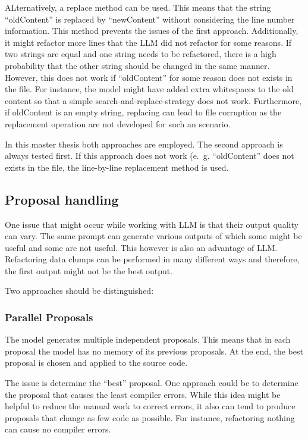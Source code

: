 ALternatively, a replace method can be used. This means that the string \enquote{oldContent} is replaced by \enquote{newContent} without considering the line number information. This method prevents the issues of the first approach. Additionally, it might refactor more lines that the \ac{LLM} did not refactor for some reasons. If two strings are equal and one string needs to be refactored, there is a high probability that the other string should be changed in the same manner. However, this does not work if \enquote{oldContent} for some reason does not exists in the file. For instance, the model might have added extra whitespaces to the old content so that a simple search-and-replace-strategy does not work. Furthermore, if oldContent is an empty string, replacing can lead to file corruption as the replacement operation are not developed for such an scenario. 

In this master thesis both approaches are employed. The second approach is always tested first. If this approach does not work (e.~g. \enquote{oldContent} does not exists in the file, the line-by-line replacement method is used.  





\subsection{Proposal handling}

One issue that might occur while working with \ac{LLM} is that their output quality can vary. The same prompt can generate various outputs of which some might be useful and some are not useful. This however is also an advantage of \acs{LLM}. Refactoring data clumps can be performed in many different ways and therefore, the first output might not be the best output. 

Two approaches should be distinguished:
\subsubsection{Parallel Proposals}
The model generates multiple independent proposals. This means that in each proposal the model has no memory of its previous proposals. At the end, the best proposal is chosen and applied to the source code.

The issue is determine the \enquote{best} proposal. One approach could be to determine the proposal that causes the least compiler errors. While this idea might be helpful to reduce the manual work to correct errors, it also can tend to produce proposals that change as few code as possible. For instance, refactoring nothing can cause no compiler errors.

